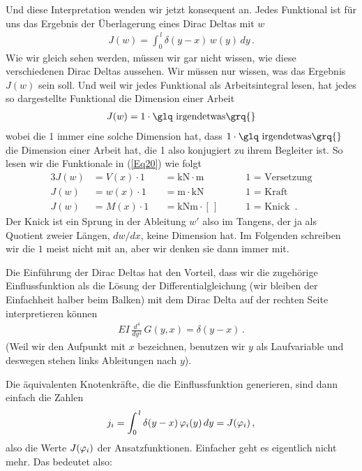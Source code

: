 Und diese Interpretation wenden wir jetzt konsequent an. Jedes Funktional ist f\"{u}r uns das Ergebnis der \"{U}berlagerung eines Dirac Deltas mit $w$
\begin{align}
J(w) = \int_0^{\,l} \delta(y-x)\,w(y)\,dy \,.
\end{align}
Wie wir gleich sehen werden, m\"{u}ssen wir gar nicht wissen, wie diese verschiedenen Dirac Deltas aussehen. Wir m\"{u}ssen nur wissen, was das Ergebnis $J(w)$ sein soll. Und weil wir jedes Funktional als Arbeitsintegral lesen, hat jedes so dargestellte Funktional die Dimension einer Arbeit
\begin{align}
J(w) = 1 \cdot \text{\glq irgendetwas\grq{}}
\end{align}
wobei die 1 immer eine solche Dimension hat, dass $1 \cdot\text{\glq irgendetwas\grq{}}$ die Dimension einer Arbeit hat, die 1 also konjugiert zu ihrem Begleiter ist. So lesen wir die Funktionale in (\ref{Eq20}) wie folgt
\begin{alignat}{3}
J(w) &= V(x) \cdot 1 &&= \text{kN}  \cdot \text{m}\, &&\quad\text{1 = Versetzung} \\
J(w) &= w(x) \cdot 1 &&= \text{m}   \cdot \text{kN}\,&&\quad\text{1 = Kraft}\\
J(w) &= M(x) \cdot 1 &&= \text{kNm} \cdot [\,] \,      &&\quad\text{1 = Knick }\,.
\end{alignat}
Der Knick ist ein Sprung in der Ableitung $w'$ also im Tangens, der ja als Quotient zweier L\"{a}ngen, $dw/dx$, keine Dimension hat. Im Folgenden schreiben wir die $1$ meist nicht mit an, aber wir denken sie dann immer mit.

Die Einf\"{u}hrung der Dirac Deltas hat den Vorteil, dass wir die zugeh\"{o}rige Einflussfunktion als die L\"{o}sung der Differentialgleichung (wir bleiben der Einfachheit halber beim Balken) mit dem Dirac Delta auf der rechten Seite interpretieren k\"{o}nnen
\begin{align}
EI\,\frac{d^4}{dy^4}\,G(y,x) = \delta (y-x)\,.
\end{align}
(Weil wir den Aufpunkt mit $x$ bezeichnen, benutzen wir $y$ als Laufvariable und deswegen stehen links Ableitungen nach $y$).

Die \"{a}quivalenten Knotenkr\"{a}fte, die die Einflussfunktion generieren, sind dann einfach die Zahlen
\begin{align}
j_i = \int_0^{\,l} \delta(y-x)\,\varphi_i(y)\,dy = J(\varphi_i)\,,
\end{align}
also die Werte $J(\varphi_i)$ der Ansatzfunktionen. Einfacher geht es eigentlich nicht mehr.
Das bedeutet also:

